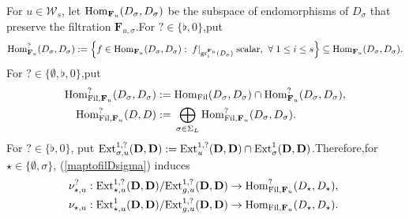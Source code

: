\documentclass[10pt]{article}
\newcommand{\fil}{{\rm Fil}}
\newcommand{\homo}{{\rm Hom}}
\newcommand{\ext}{{\rm Ext}}
\newcommand{\gr}{{\rm gr}}
\newcommand{\Dpik}{{\mathbf{D}}}
\newcommand{\bF}{{\mathbf{F}}}
\newcommand{\sW}{\mathscr W}
\begin{document}
For $u\in \sW_s$, let $\homo_{\bF_u}(D_{\sigma},D_{\sigma})$ be the subspace of endomorphisms of $D_{\sigma}$ that preserve the filtration $\bF_{u,\sigma}$.\;For $?\in \{\flat,0\}$,\;put
\[\homo^{?}_{\bF_u}(D_{\sigma},D_{\sigma}):=\left\{f\in \homo_{\bF_u}(D_{\sigma},D_{\sigma}):\;f|_{\gr_{i}^{\bF_u}(D_{\sigma})} \text{\;scalar,\;}\;\forall \;1\leq i\leq s\right\}\subseteq \homo_{\bF_u}(D_{\sigma},D_{\sigma}).\]
For $?\in \{\emptyset,\flat,0\}$,\;put
\begin{equation}
	\begin{aligned}
		\homo^{?}_{\fil,\bF_u}(D_{\sigma},D_{\sigma}):=&\;\homo_{\fil}(D_{\sigma},D_{\sigma})\cap \homo^{?}_{\bF_u}(D_{\sigma},D_{\sigma}),\\
		\homo^{?}_{\fil,\bF_u}(D,D):=&\;\bigoplus_{\sigma\in\Sigma_L}\homo^{?}_{\fil,\bF_u}(D_{\sigma},D_{\sigma}).\;
	\end{aligned}
\end{equation}
For $?\in\{\flat,0\}$, put $\ext^{1,?}_{\sigma,u}(\Dpik,\Dpik):=\ext^{1,?}_{u}(\Dpik,\Dpik)\cap \ext^{1}_{\sigma}(\Dpik,\Dpik)$.\;Therefore,\;for $\star\in\{\emptyset,\sigma\}$, (\ref{maptofilDsigma}) induces
\begin{equation}\label{sendtofilD}
	\begin{aligned}
		\nu^?_{\star,u}:&\;\ext^{1,?}_{\star,u}(\Dpik,\Dpik)/\ext^{1,?}_{g,u}(\Dpik,\Dpik)\rightarrow\homo^{?}_{\fil,\bF_u}(D_{\star},D_{\star}),\\
		\nu_{\star,u}:&\;\ext^{1}_{\star,u}(\Dpik,\Dpik)/\ext^{1,?}_{g,u}(\Dpik,\Dpik)\rightarrow\homo_{\fil,\bF_u}(D_{\star},D_{\star}).\;
	\end{aligned}
\end{equation}
\end{document}
